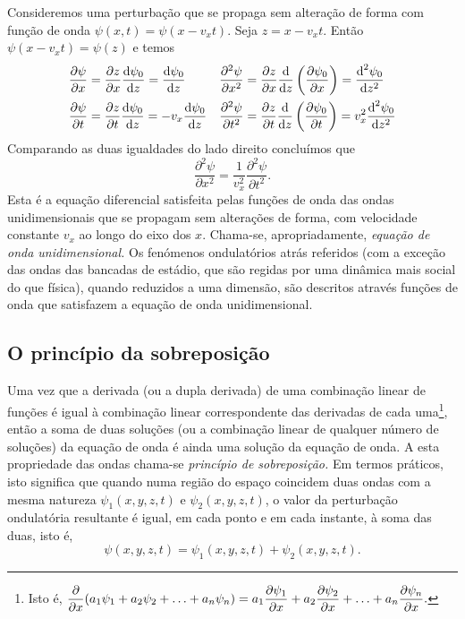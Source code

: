 Consideremos uma perturbação que se propaga sem alteração de forma com função de
onda $\psi(x,t)=\psi(x-v_xt)$. Seja $z=x-v_xt$. Então $\psi(x-v_xt)=\psi(z)$ e temos
\begin{align*}
    \frac{\partial \psi}{\partial x}&=\frac{\partial z}{\partial x}\frac{\text{d} \psi_0}{\text{d} z}=\frac{\text{d} \psi_0}{\text{d} z}&
    \frac{\partial^2\psi}{\partial x^2}&=\frac{\partial z}{\partial x}\frac{\text{d} }{\text{d} z}\left(\frac{\partial \psi_0}{\partial x}
        \right)=\frac{\text{d}^2\psi_0}{\text{d}z^2}\\
    \frac{\partial \psi}{\partial t}&=\frac{\partial z}{\partial t}\frac{\text{d} \psi_0}{\text{d} z}=-v_x\frac{\text{d} \psi_0}{\text{d} z}&
    \frac{\partial^2\psi}{\partial t^2}&=\frac{\partial z}{\partial t}\frac{\text{d} }{\text{d} z}\left(\frac{\partial \psi_0}{\partial t}
        \right)=v_x^2\frac{\text{d}^2\psi_0}{\text{d}z^2}
\end{align*}
Comparando as duas igualdades do lado direito concluímos que
\begin{equation}\label{eq:waveq}
    \frac{\partial^2\psi}{\partial x^2} =
        \frac{1}{v_x^2} \frac{\partial^2\psi}{\partial t^2}.
\end{equation}
Esta é a equação diferencial satisfeita pelas funções de onda das ondas
unidimensionais que se propagam sem alterações de forma, com velocidade
constante $v_x$ ao longo do eixo dos $x$. Chama-se, apropriadamente, \emph{equação
de onda unidimensional.} Os fenómenos ondulatórios atrás referidos (com a
exceção das ondas das bancadas de estádio, que são regidas por uma dinâmica mais
social do que física), quando reduzidos a uma dimensão, são descritos através
funções de onda que satisfazem a equação de onda unidimensional.


\subsection{O princípio da sobreposição}
Uma vez que a derivada (ou a dupla derivada) de uma combinação linear de funções
é igual à combinação linear correspondente das derivadas de cada
uma\footnote{Isto é,
    $\displaystyle\frac{\partial }{\partial x}(a_1\psi_1+a_2\psi_2+\ldots+a_n\psi_n)=
a_1\frac{\partial \psi_1}{\partial x}+a_2\frac{\partial \psi_2}{\partial x}+\ldots+a_n\frac{\partial \psi_n}{\partial x}.$}, então a soma
de duas soluções (ou a combinação linear de qualquer número de soluções) da
equação de onda é ainda uma solução da equação de onda. A esta propriedade das
ondas chama-se \emph{princípio de sobreposição.} Em termos práticos, isto
significa que quando numa região do espaço coincidem duas ondas com a mesma
natureza $\psi_1(x,y,z,t)$ e $\psi_2(x,y,z,t)$, o valor da perturbação
ondulatória resultante é igual, em cada ponto e em cada instante, à soma das
duas, isto é,
\begin{equation*}
\psi(x,y,z,t)=\psi_1(x,y,z,t)+\psi_2(x,y,z,t).
\end{equation*}

